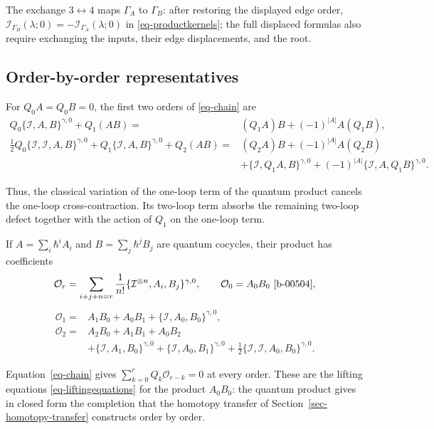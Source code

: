 \documentclass[11pt]{article}
\numberwithin{equation}{section}
\numberwithin{figure}{section}
\numberwithin{table}{section}
\begin{document}
The exchange $3\leftrightarrow4$ maps $\Gamma_A$ to $\Gamma_B$: after restoring the displayed edge order, $\mathcal I_{\Gamma_B}(\lambda;0)=-\mathcal I_{\Gamma_A}(\lambda;0)$ in \eqref{eq-productkernels}; the full displaced formulas also require exchanging the inputs, their edge displacements, and the root.

\subsection{Order-by-order representatives}\label{sec-order-by-order}

For $Q_0A=Q_0B=0$, the first two orders of \eqref{eq-chain} are
\begin{equation}\label{eq-2-55}
\begin{aligned}
Q_0\{\mathcal I,A,B\}^{\gamma,0}+Q_1(AB)
={}&(Q_1A)B+(-1)^{|A|}A(Q_1B),\\[3pt]
\frac12Q_0\{\mathcal I,\mathcal I,A,B\}^{\gamma,0}
+Q_1\{\mathcal I,A,B\}^{\gamma,0}+Q_2(AB)
={}&(Q_2A)B+(-1)^{|A|}A(Q_2B)\\
&+\{\mathcal I,Q_1A,B\}^{\gamma,0}
+(-1)^{|A|}\{\mathcal I,A,Q_1B\}^{\gamma,0}.
\end{aligned}
\end{equation}

Thus, the classical variation of the one-loop term of the quantum product cancels the one-loop cross-contraction. Its two-loop term absorbs the remaining two-loop defect together with the action of $Q_1$ on the one-loop term.

If $A=\sum_i\hbar^iA_i$ and $B=\sum_j\hbar^jB_j$ are quantum cocycles, their product has coefficients
\begin{equation}\label{eq-2-32}
\mathcal O_r=\sum_{i+j+n=r}\frac1{n!}\{\mathcal I^{\otimes n},A_i,B_j\}^{\gamma,0},\qquad\mathcal O_0=A_0B_0\ \text{\eqref{b-00504}},
\end{equation}
\begin{equation}\label{eq-2-33}
\begin{aligned}
\mathcal O_1={}&A_1B_0+A_0B_1
+{\{\mathcal I,A_0,B_0\}^{\gamma,0}},\\
\mathcal O_2={}&A_2B_0+A_1B_1+A_0B_2\\
&+\{\mathcal I,A_1,B_0\}^{\gamma,0}
+\{\mathcal I,A_0,B_1\}^{\gamma,0}
+{\frac12\{\mathcal I,\mathcal I,A_0,B_0\}^{\gamma,0}}.
\end{aligned}
\end{equation}

Equation~\eqref{eq-chain} gives $\sum_{k=0}^rQ_k\mathcal O_{r-k}=0$ at every order. These are the lifting equations \eqref{eq-liftingequations} for the product $A_0B_0$: the quantum product gives in closed form the completion that the homotopy transfer of Section~\ref{sec-homotopy-transfer} constructs order by order.
\end{document}
